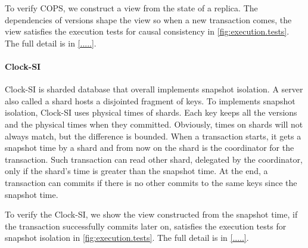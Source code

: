 To verify COPS, we construct a view from the state of a replica.
The dependencies of versions shape the view so 
when a new transaction comes, 
the view satisfies the execution tests for causal consistency in \cref{fig:execution.tests}.
The full detail is in \cref{.....}.

\paragraph{\bf Clock-SI}
Clock-SI is sharded database that overall implements snapshot isolation.
A server also called a shard hosts a disjointed fragment of keys.
To implements snapshot isolation, Clock-SI uses physical times of shards.
Each key keeps all the versions and the physical times when they committed.
Obviously, times on shards will not always match, but the difference is bounded.
When a transaction starts, it gets a snapshot time by a shard and from now on the shard is the coordinator for the transaction.
Such transaction can read other shard, delegated by the coordinator, only if the shard's time is greater than the snapshot time.
At the end, a transaction can commits if there is no other commits to the same keys since the snapshot time.

To verify the Clock-SI, we show the view constructed from the snapshot time, if the transaction successfully commits later on, satisfies the execution tests for snapshot isolation in \cref{fig:execution.tests}.
The full detail is in \cref{.....}.
